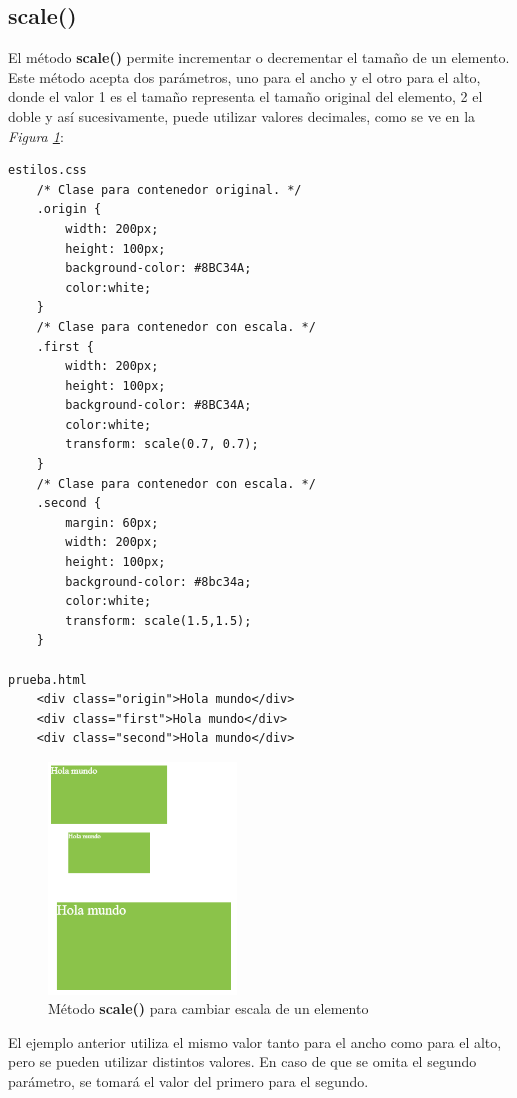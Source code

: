 \subsection{scale()}

El método \textbf{scale()} permite incrementar o decrementar el tamaño de un elemento. Este método acepta dos parámetros, uno para el ancho y el otro para el alto, donde el valor 1 es el tamaño representa el tamaño original del elemento, 2 el doble y así sucesivamente, puede utilizar valores decimales, como se ve en la \textit{Figura \ref{fig: 56}}:
\begin{lstlisting}
estilos.css
    /* Clase para contenedor original. */
    .origin {
        width: 200px;
        height: 100px;
        background-color: #8BC34A;
        color:white;
    }
    /* Clase para contenedor con escala. */
    .first {
        width: 200px;
        height: 100px;
        background-color: #8BC34A;
        color:white;
        transform: scale(0.7, 0.7);
    }
    /* Clase para contenedor con escala. */
    .second {
        margin: 60px;
        width: 200px;
        height: 100px;
        background-color: #8bc34a;
        color:white;
        transform: scale(1.5,1.5);
    }

prueba.html
    <div class="origin">Hola mundo</div>
    <div class="first">Hola mundo</div>
    <div class="second">Hola mundo</div>
\end{lstlisting}
\begin{figure}[H]
    \centering
    \caption{Método \textbf{scale()} para cambiar escala de un elemento}
    \label{fig: 56}
    \includegraphics[width=5cm]{ss/scale.png}
\end{figure}

El ejemplo anterior utiliza el mismo valor tanto para el ancho como para el alto, pero se pueden utilizar distintos valores. En caso de que se omita el segundo parámetro, se tomará el valor del primero para el segundo.



